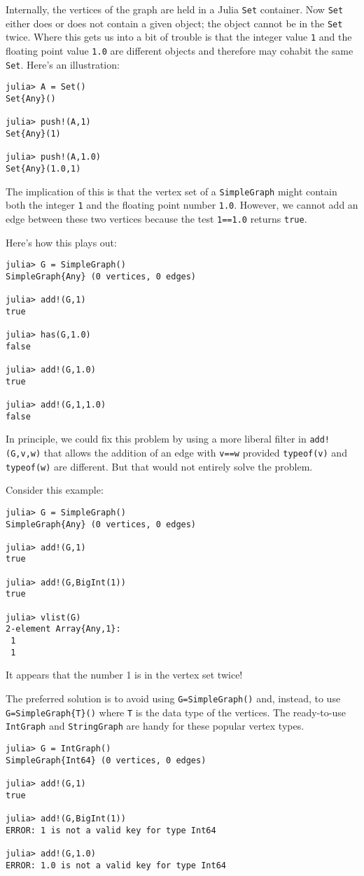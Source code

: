 \documentclass[oneside]{amsart}
\begin{document}
Internally, the vertices of the graph are held in a Julia \verb|Set|
container. Now \verb|Set| either does or does not contain a given
object; the object cannot be in the \verb|Set| twice. Where this gets
us into a bit of trouble is that the integer value \verb|1| and the
floating point value \verb|1.0| are different objects and therefore
may cohabit the same \verb|Set|. Here's an illustration:
\begin{verbatim}
julia> A = Set()
Set{Any}()

julia> push!(A,1)
Set{Any}(1)

julia> push!(A,1.0)
Set{Any}(1.0,1)
\end{verbatim}
The implication of this is that the vertex set of a \verb|SimpleGraph|
might contain both the integer \verb|1| and the floating point number
\verb|1.0|. However, we cannot add an edge between these two vertices
because the test \verb|1==1.0| returns \verb|true|.

Here's how this plays out:
\begin{verbatim}
julia> G = SimpleGraph()
SimpleGraph{Any} (0 vertices, 0 edges)

julia> add!(G,1)
true

julia> has(G,1.0)
false

julia> add!(G,1.0)
true

julia> add!(G,1,1.0)
false
\end{verbatim}

In principle, we could fix this problem by using a more liberal filter
in \verb|add!(G,v,w)| that allows the addition of an edge with
\verb|v==w| provided \verb|typeof(v)| and \verb|typeof(w)| are
different. But that would not entirely solve the problem.

Consider this example:
\begin{verbatim}
julia> G = SimpleGraph()
SimpleGraph{Any} (0 vertices, 0 edges)

julia> add!(G,1)
true

julia> add!(G,BigInt(1))
true

julia> vlist(G)
2-element Array{Any,1}:
 1
 1
\end{verbatim}
It appears that the number 1 is in the vertex set twice!

The preferred solution is to avoid using \verb|G=SimpleGraph()|
and, instead, to use \verb|G=SimpleGraph{T}()| where \verb|T| is the
data type of the vertices. The ready-to-use \verb|IntGraph| and
\verb|StringGraph| are handy for these popular vertex types.
\begin{verbatim}
julia> G = IntGraph()
SimpleGraph{Int64} (0 vertices, 0 edges)

julia> add!(G,1)
true

julia> add!(G,BigInt(1))
ERROR: 1 is not a valid key for type Int64

julia> add!(G,1.0)
ERROR: 1.0 is not a valid key for type Int64
\end{verbatim}
\end{document}
